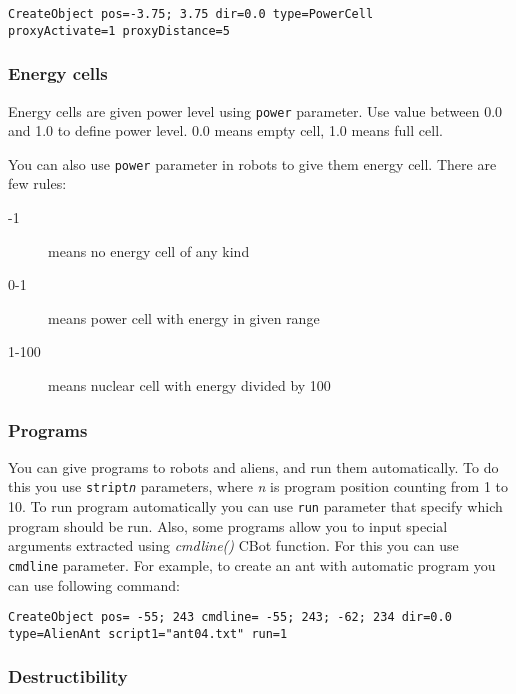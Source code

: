 \begin{verbatim}
CreateObject pos=-3.75; 3.75 dir=0.0 type=PowerCell
proxyActivate=1 proxyDistance=5
\end{verbatim}



\subsubsection{Energy cells}

Energy cells are given power level using \texttt{power} parameter. Use value between 0.0 and 1.0 to define power level. 0.0 means empty cell, 1.0 means full cell.

You can also use \texttt{power} parameter in robots to give them energy cell. There are few rules:

\begin{description}
    \item[-1] means no energy cell of any kind
    \item[0-1] means power cell with energy in given range
    \item[1-100] means nuclear cell with energy divided by 100
\end{description}


\subsubsection{Programs}

You can give programs to robots and aliens, and run them automatically. To do this you use \texttt{stript\emph{n}} parameters, where \emph{n} is program position counting from 1 to 10. To run program automatically you can use \texttt{run} parameter that specify which program should be run. Also, some programs allow you to input special arguments extracted using \emph{cmdline()} CBot function. For this you can use \texttt{cmdline} parameter. For example, to create an ant with automatic program you can use following command:

\begin{verbatim}
CreateObject pos= -55; 243 cmdline= -55; 243; -62; 234 dir=0.0
type=AlienAnt script1="ant04.txt" run=1
\end{verbatim}


\subsubsection{Destructibility}

